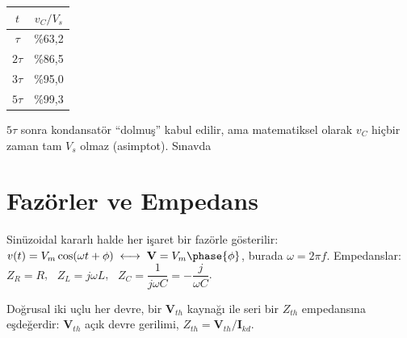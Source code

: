\documentclass[11pt,a4paper]{article}
\begin{document}
\noindent
\begin{minipage}[c]{0.36\linewidth}
  \centering
  \begin{tabular}{cc}
    \toprule
    $t$ & $v_C / V_s$ \\ \midrule
    $\tau$  & \%63,2 \\
    $2\tau$ & \%86,5 \\
    $3\tau$ & \%95,0 \\
    $5\tau$ & \%99,3 \\ \bottomrule
  \end{tabular}
\end{minipage}\hfill
\begin{minipage}[c]{0.6\linewidth}
  \centering
\end{minipage}

\begin{dikkat}
  $5\tau$ sonra kondansatör ``dolmuş'' kabul edilir, ama matematiksel olarak
  $v_C$ hiçbir zaman tam $V_s$ olmaz (asimptot). Sınavda 
\end{dikkat}

\section{Fazörler ve Empedans}
Sinüzoidal kararlı halde her işaret bir fazörle gösterilir:
$v(t) = V_m\cos(\omega t + \phi) \donusum \mathbf{V} = V_m\phase{\phi}$, burada $\omega = 2\pi f$.
Empedanslar: $Z_R = R$, \ $Z_L = j\omega L$, \ $Z_C = \dfrac{1}{j\omega C} = -\dfrac{j}{\omega C}$.

\begin{teorem}[(Thevenin)]
  Doğrusal iki uçlu her devre, bir $\mathbf{V}_{th}$ kaynağı ile seri bir $Z_{th}$ empedansına
  eşdeğerdir: $\mathbf{V}_{th}$ açık devre gerilimi, $Z_{th} = \mathbf{V}_{th}/\mathbf{I}_{kd}$.
\end{teorem}
\end{document}
